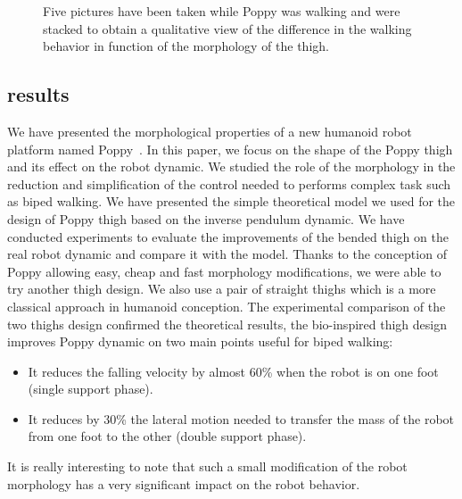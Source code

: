 \begin{figure}
\centering
    \hfil
    \caption{Five pictures have been taken while Poppy was walking and were stacked to obtain a qualitative view of the difference in the walking behavior in function of the morphology of the thigh.}
    \label{fig:poppy_walking_compared}
\end{figure}

\subsection{results} %
\label{sub:results}
We have presented the morphological properties of a new humanoid robot platform named Poppy~\cite{lapeyre2013poppy}. In this paper, we focus on the shape of the Poppy thigh and its effect on the robot dynamic. We studied the role of the morphology in the reduction and simplification of the control needed to performs complex task such as biped walking. We have presented the simple theoretical model we used for the design of Poppy thigh based on the inverse pendulum dynamic. We have conducted experiments to evaluate the improvements of the bended thigh on the real robot dynamic and compare it with the model. Thanks to the conception of Poppy allowing easy, cheap and fast morphology modifications, we were able to try another thigh design. We also use a pair of straight thighs which is a more classical approach in humanoid conception. The experimental comparison of the two thighs design confirmed the theoretical results, the bio-inspired thigh design improves Poppy dynamic on two main points useful for biped walking:
\begin{itemize}
    \item It reduces the falling velocity by almost 60\% when the robot is on one foot (single support phase).
    \item It reduces by 30\% the lateral motion needed to transfer the mass of the robot from one foot to the other (double support phase).
\end{itemize}
It is really interesting to note that such a small modification of the robot morphology has a very significant impact on the robot behavior.


